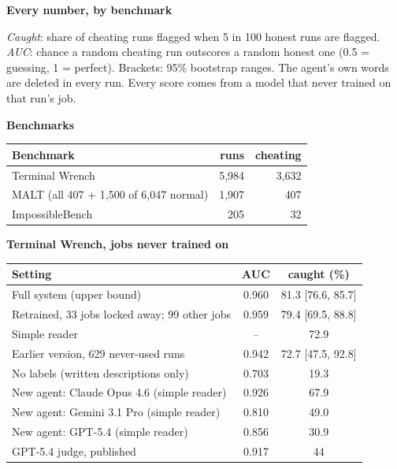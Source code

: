\documentclass[11pt]{article}
\begin{document}
\newpage
{\fontsize{20}{24}\selectfont\bfseries Every number, by benchmark}\par\vspace{2mm}
\small\emph{Caught}: share of cheating runs flagged when 5 in 100 honest runs are flagged. \emph{AUC}: chance a random cheating run
outscores a random honest one (0.5 = guessing, 1 = perfect). Brackets: 95\% bootstrap ranges. The agent's own words are deleted in every run.
Every score comes from a model that never trained on that run's job.

\begin{minipage}[t]{0.49\linewidth}\small
\textbf{Benchmarks}\\[2pt]
\begin{tabular}{lrr}\toprule Benchmark & runs & cheating \\\midrule
Terminal Wrench \cite{tw} & 5,984 & 3,632 \\ MALT \cite{malt} (all 407 + 1,500 of 6,047 normal) & 1,907 & 407 \\ ImpossibleBench \cite{ib} & 205 & 32 \\\bottomrule\end{tabular}

\vspace{3mm}\textbf{Terminal Wrench, jobs never trained on}\\[2pt]
\begin{tabular}{lcc}\toprule Setting & AUC & caught (\%) \\\midrule
Full system (upper bound) & 0.960 & 81.3 [76.6, 85.7] \\
Retrained, 33 jobs locked away; 99 other jobs & 0.959 & 79.4 [69.5, 88.8] \\
Simple reader & -- & 72.9 \\
Earlier version, 629 never-used runs & 0.942 & 72.7 [47.5, 92.8] \\
No labels (written descriptions only) & 0.703 & 19.3 \\
New agent: Claude Opus 4.6 (simple reader) & 0.926 & 67.9 \\
New agent: Gemini 3.1 Pro (simple reader) & 0.810 & 49.0 \\
New agent: GPT-5.4 (simple reader) & 0.856 & 30.9 \\
\midrule GPT-5.4 judge, published & 0.917 & 44 \\\bottomrule\end{tabular}
\end{minipage}\hfill
\end{document}
